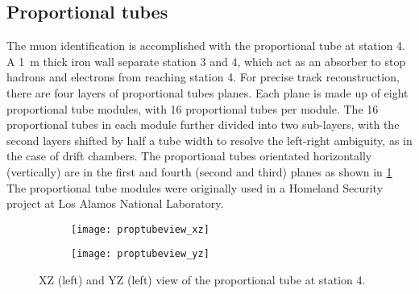 \documentclass[../main.tex]{subfiles}
\begin{document}
\subsection{Proportional tubes}
The muon identification is accomplished with the proportional tube at station 4. A \SI{1}{\meter} thick
iron wall separate station 3 and 4, which act as an absorber to stop hadrons and electrons from reaching
station 4. For precise track reconstruction, there are four layers of proportional tubes planes. Each plane
is made up of eight proportional tube modules, with 16 proportional tubes per module. The 16 proportional tubes
in each module further divided into two sub-layers, with the second layers shifted by half a tube width to
resolve the left-right ambiguity, as in the case of drift chambers. The proportional tubes orientated horizontally
(vertically) are in the first and fourth (second and third) planes as shown in \cref{fig:prop}
The proportional tube modules were originally used in a Homeland Security project at Los Alamos National Laboratory.

\begin{figure}[ht!]
\centering
\begin{subfigure}{0.45\linewidth}
\texttt{[image: proptubeview\_xz]}
\end{subfigure}
\begin{subfigure}{0.45\linewidth}
\texttt{[image: proptubeview\_yz]}
\end{subfigure}
\caption{XZ (left) and YZ (left) view of the proportional tube at station 4.}
\label{fig:prop}
\end{figure}
\end{document}
